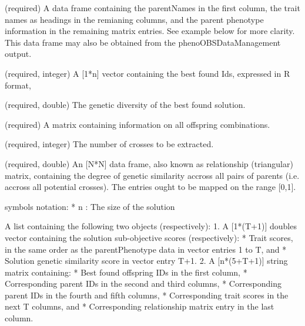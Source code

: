 \documentclass[a4paper]{book}
\begin{document}
%
\begin{Arguments}
\begin{ldescription}
\item[\code{parentsPhenotypeDataFrame}] (required) A data frame containing the parentNames in the first column, the trait names as headings in the remianing columns, and the parent phenotype information in the remaining matrix entries.
See example below for more clarity.
This data frame may also be obtained from the phenoOBSDataManagement output.

\item[\code{optimalSolutionIdsR}] (required, integer) A [1*n] vector containing the best found Ids, expressed in R format,

\item[\code{bestFoundSolutionGeneticDiversity}] (required, double) The genetic diversity of the best found solution.

\item[\code{overallOffspringInformation}] (required) A matrix containing information on all offspring combinations.

\item[\code{solutionSize}] (required, integer) The number of crosses to be extracted.

\item[\code{parentsGeneticSimilarityMatrix}] (required, double) An [N*N] data frame, also known as relationship (triangular) matrix, containing the degree of genetic similarity accross all pairs of parents (i.e. accross all potential crosses).
The entries ought to be mapped on the range [0,1].
\end{ldescription}
\end{Arguments}
%
\begin{Details}\relax
symbols notation:
* n : The size of the solution
\end{Details}
%
\begin{Value}
A list containing the following two objects (respectively): 
1. A [1*(T+1)] doubles vector containing the solution sub-objective scores (respectively): 
* Trait scores, in the same order as the parentPhenotype data in vector entries 1 to T, and
* Solution genetic similarity score in vector entry T+1.
2. A [n*(5+T+1)] string matrix containing:
* Best found offspring IDs in the first column,
* Corresponding parent IDs in the second and third columns,
* Corresponding parent IDs in the fourth and fifth columns,
* Corresponding trait scores in the next T columns, and
* Corresponding relationship matrix entry in the last column.
\end{Value}
\end{document}
